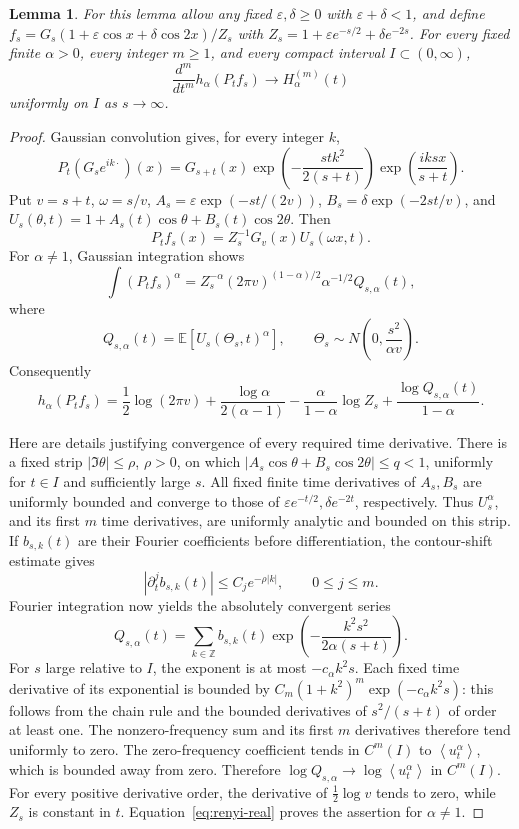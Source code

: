 \documentclass[11pt]{article}
\newtheorem{lemma}[theorem]{Lemma}
\newcommand{\av}[1]{\left\langle #1\right\rangle}
\begin{document}
\begin{lemma}\label{lem:local}
For this lemma allow any fixed $\varepsilon,\delta\ge0$ with $\varepsilon+\delta<1$, and define $f_s=G_s(1+\varepsilon\cos x+\delta\cos2x)/Z_s$ with $Z_s=1+\varepsilon e^{-s/2}+\delta e^{-2s}$. For every fixed finite $\alpha>0$, every integer $m\ge1$, and every compact interval $I\subset(0,\infty)$,
\[
 \frac{d^m}{dt^m}h_\alpha(P_t f_s)\longrightarrow H_\alpha^{(m)}(t)
\]
uniformly on $I$ as $s\to\infty$.
\end{lemma}
\begin{proof}
Gaussian convolution gives, for every integer $k$,
\[
 P_t(G_s e^{ik\cdot})(x)=G_{s+t}(x)
 \exp\left(-\frac{stk^2}{2(s+t)}\right)
 \exp\left(\frac{iksx}{s+t}\right).
\]
Put $v=s+t$, $\omega=s/v$, $A_s=\varepsilon\exp(-st/(2v))$, $B_s=\delta\exp(-2st/v)$, and $U_s(\theta,t)=1+A_s(t)\cos\theta+B_s(t)\cos2\theta$. Then
\[
 P_t f_s(x)=Z_s^{-1}G_v(x)U_s(\omega x,t).
\]
For $\alpha\ne1$, Gaussian integration shows
\[
 \int(P_t f_s)^\alpha
 =Z_s^{-\alpha}(2\pi v)^{(1-\alpha)/2}\alpha^{-1/2}Q_{s,\alpha}(t),
\]
where
\[
 Q_{s,\alpha}(t)=\mathbb E[U_s(\Theta_s,t)^\alpha],
 \qquad \Theta_s\sim N\left(0,\frac{s^2}{\alpha v}\right).
\]
Consequently
\begin{equation}\label{eq:renyi-real}
 h_\alpha(P_t f_s)=\frac12\log(2\pi v)+\frac{\log\alpha}{2(\alpha-1)}
 -\frac{\alpha}{1-\alpha}\log Z_s+\frac{\log Q_{s,\alpha}(t)}{1-\alpha}.
\end{equation}

Here are details justifying convergence of every required time derivative. There is a fixed strip $|\Im\theta|\le\rho$, $\rho>0$, on which $|A_s\cos\theta+B_s\cos2\theta|\le q<1$, uniformly for $t\in I$ and sufficiently large $s$. All fixed finite time derivatives of $A_s,B_s$ are uniformly bounded and converge to those of $\varepsilon e^{-t/2},\delta e^{-2t}$, respectively. Thus $U_s^\alpha$, and its first $m$ time derivatives, are uniformly analytic and bounded on this strip. If $b_{s,k}(t)$ are their Fourier coefficients before differentiation, the contour-shift estimate gives
\[
 |\partial_t^j b_{s,k}(t)|\le C_j e^{-\rho|k|},\qquad 0\le j\le m.
\]
Fourier integration now yields the absolutely convergent series
\[
 Q_{s,\alpha}(t)=\sum_{k\in\mathbb Z}b_{s,k}(t)
 \exp\left(-\frac{k^2s^2}{2\alpha(s+t)}\right).
\]
For $s$ large relative to $I$, the exponent is at most $-c_\alpha k^2s$. Each fixed time derivative of its exponential is bounded by $C_m(1+k^2)^m\exp(-c_\alpha k^2s)$: this follows from the chain rule and the bounded derivatives of $s^2/(s+t)$ of order at least one. The nonzero-frequency sum and its first $m$ derivatives therefore tend uniformly to zero. The zero-frequency coefficient tends in $C^m(I)$ to $\av{u_t^\alpha}$, which is bounded away from zero. Therefore $\log Q_{s,\alpha}\to\log\av{u_t^\alpha}$ in $C^m(I)$. For every positive derivative order, the derivative of $\frac12\log v$ tends to zero, while $Z_s$ is constant in $t$. Equation~\eqref{eq:renyi-real} proves the assertion for $\alpha\ne1$.


\end{proof}
\end{document}
